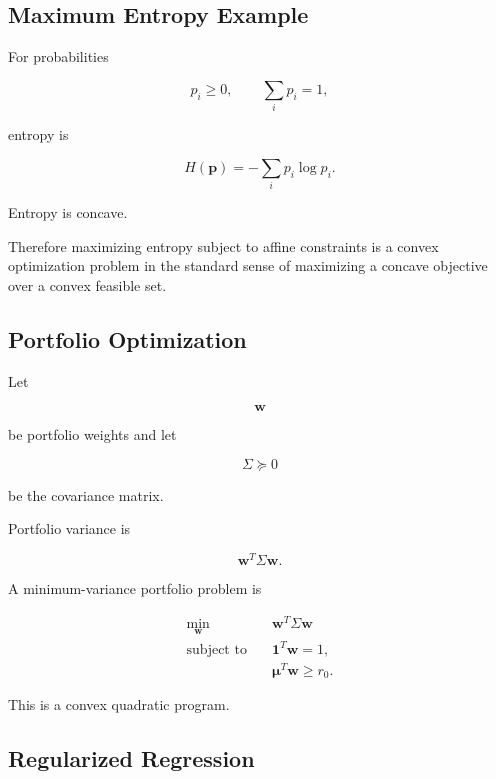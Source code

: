 \subsection{Maximum Entropy Example}
\label{subsec:maximum-entropy-convex}

For probabilities

\[
p_i\geq0,
\qquad
\sum_i p_i=1,
\]

entropy is

\[
\boxed{
H(\mathbf{p})
=
-
\sum_i
p_i\log p_i.
}
\]

Entropy is concave.

Therefore maximizing entropy subject to affine constraints is a convex
optimization problem in the standard sense of maximizing a concave
objective over a convex feasible set.

\subsection{Portfolio Optimization}
\label{subsec:portfolio-convex-optimization}

Let

\[
\mathbf{w}
\]

be portfolio weights and let

\[
\Sigma\succeq0
\]

be the covariance matrix.

Portfolio variance is

\[
\boxed{
\mathbf{w}^T
\Sigma
\mathbf{w}.
}
\]

A minimum-variance portfolio problem is

\[
\boxed{
\begin{aligned}
\min_{\mathbf{w}}
\quad&
\mathbf{w}^T
\Sigma
\mathbf{w}
\\
\text{subject to}
\quad&
\mathbf{1}^T\mathbf{w}=1,
\\
&
\boldsymbol{\mu}^T\mathbf{w}
\geq
r_0.
\end{aligned}
}
\]

This is a convex quadratic program.

\subsection{Regularized Regression}
\label{subsec:regularized-regression-convex}


